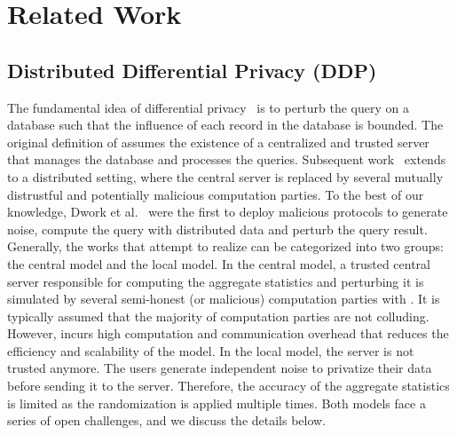 \chapter{Related Work}
\label{cha:RelatedWork}

\section{Distributed Differential Privacy (DDP)}
\label{sec:DistributedDifferentialPrivacy}

The fundamental idea of differential privacy~\cite{dwork2006differential} is to perturb the query on a database such that the influence of each record in the database is bounded. The original definition of \differentialprivacy assumes the existence of a centralized and trusted server that manages the database and processes the queries. Subsequent work~\cite{dwork2006our} extends \differentialprivacy to a distributed setting, where the central server is replaced by several mutually distrustful and potentially malicious computation parties. To the best of our knowledge, Dwork et al.~\cite{dwork2006our} were the first to deploy malicious \smpc protocols to generate noise, compute the query with distributed data and perturb the query result. Generally, the works that attempt to realize \ddp can be categorized into two groups: the central \differentialprivacy model and the local \differentialprivacy model.
In the central \differentialprivacy model, a trusted central server responsible for computing the aggregate statistics and perturbing it is simulated by several semi-honest (or malicious) computation parties with \smpc. It is typically assumed that the majority of computation parties are not colluding. However, \smpc incurs high computation and communication overhead that reduces the efficiency and scalability of the model.
In the local \differentialprivacy model, the server is not trusted anymore. The users generate independent noise to privatize their data before sending it to the server. Therefore, the accuracy of the aggregate statistics is limited as the randomization is applied multiple times. Both models face a series of open challenges, and we discuss the details below.

